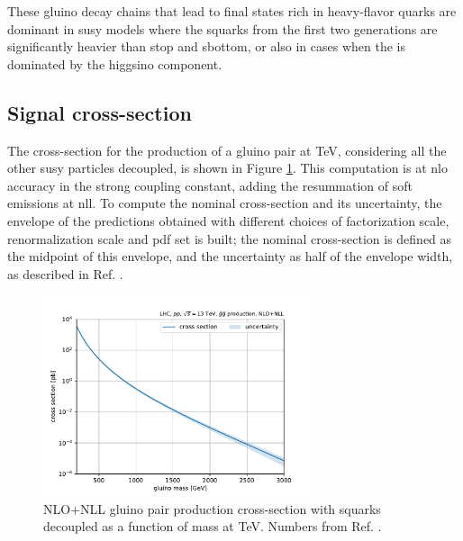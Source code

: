 These gluino decay chains that lead to final states rich in heavy-flavor quarks are dominant in \gls{susy} models where the squarks 
from the first two generations are significantly heavier than stop and sbottom, or also in cases when the \ninoone is dominated by the higgsino component. 

\subsection{Signal cross-section}
\label{sec:strong:signalxsec}

The cross-section for the production of a gluino pair at \cmtre TeV, considering all the other \gls{susy} particles decoupled, is shown in Figure 
\ref{fig:strong:xsec}. This computation is at \gls{nlo} accuracy in the strong coupling constant, adding the resummation of soft emissions at \gls{nll}.
To compute the nominal cross-section and its uncertainty, the envelope of the predictions obtained with different choices of factorization scale, 
renormalization scale and \gls{pdf} set is built; the nominal cross-section is defined as the midpoint of this envelope, and the uncertainty as 
half of the envelope width, as described in Ref. \cite{Borschensky:2014cia}.


\begin{figure}[h]
\centering 
\includegraphics[width=0.70\textwidth]{figures/Chap8/Rizzi-Fig8-3-1.pdf}
\caption{NLO+NLL gluino pair production cross-section with squarks decoupled as a function of mass at \cmtre TeV. Numbers from Ref. \cite{Borschensky:2014cia}.
}\label{fig:strong:xsec}
\end{figure}



